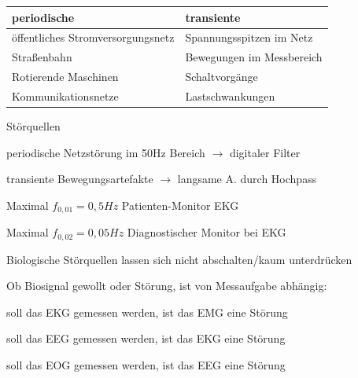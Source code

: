 \documentclass[a4paper]{article}
\begin{document}
\begin{multicols}{3}

  \begin{tabular}{l|l}
    periodische                       & transiente                \\\hline
    öffentliches Stromversorgungsnetz & Spannungsspitzen im Netz  \\
    Straßenbahn                       & Bewegungen im Messbereich \\
    Rotierende Maschinen              & Schaltvorgänge            \\
    Kommunikationsnetze               & Lastschwankungen
  \end{tabular}

  Störquellen
  \begin{itemize*}
    \item periodische Netzstörung im 50Hz Bereich $\rightarrow$ digitaler Filter
    \item transiente Bewegungsartefakte $\rightarrow$ langsame A. durch Hochpass
    \begin{itemize*}
      \item Maximal $f_{0,01}=0,5 Hz$ Patienten-Monitor EKG
      \item Maximal $f_{0,02}=0,05Hz$ Diagnostischer Monitor bei EKG
    \end{itemize*}
    \item Biologische Störquellen lassen sich nicht abschalten/kaum unterdrücken
  \end{itemize*}

  Ob Biosignal gewollt oder Störung, ist von Messaufgabe abhängig:
  \begin{itemize*}
    \item soll das EKG gemessen werden, ist das EMG eine Störung
    \item soll das EEG gemessen werden, ist das EKG eine Störung
    \item soll das EOG gemessen werden, ist das EEG eine Störung
  \end{itemize*}



\end{multicols}
\end{document}
